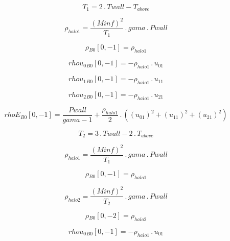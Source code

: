 \documentclass{article}
\begin{document}
\begin{dmath}T_{1} = 2 \,.\, Twall - T_{above}\end{dmath}

\begin{dmath}\rho_{halo 1} = \frac{\left(Minf \right)^{2}}{T_{1}} \,.\, gama \,.\, Pwall\end{dmath}

\begin{dmath}{\rho{_{B0}}}[{0,-1}] = \rho_{halo 1}\end{dmath}

\begin{dmath}{rhou_{0}{_{B0}}}[{0,-1}] = - \rho_{halo 1} \,.\, u_{01}\end{dmath}

\begin{dmath}{rhou_{1}{_{B0}}}[{0,-1}] = - \rho_{halo 1} \,.\, u_{11}\end{dmath}

\begin{dmath}{rhou_{2}{_{B0}}}[{0,-1}] = - \rho_{halo 1} \,.\, u_{21}\end{dmath}

\begin{dmath}{rhoE{_{B0}}}[{0,-1}] = \frac{Pwall}{gama - 1} + \frac{\rho_{halo 1}}{2} \,.\, \left(\left(u_{01} \right)^{2} + \left(u_{11} \right)^{2} + \left(u_{21} \right)^{2}\right)\end{dmath}

\begin{dmath}T_{2} = 3 \,.\, Twall - 2 \,.\, T_{above}\end{dmath}

\begin{dmath}\rho_{halo 1} = \frac{\left(Minf \right)^{2}}{T_{1}} \,.\, gama \,.\, Pwall\end{dmath}

\begin{dmath}{\rho{_{B0}}}[{0,-1}] = \rho_{halo 1}\end{dmath}

\begin{dmath}\rho_{halo 2} = \frac{\left(Minf \right)^{2}}{T_{2}} \,.\, gama \,.\, Pwall\end{dmath}

\begin{dmath}{\rho{_{B0}}}[{0,-2}] = \rho_{halo 2}\end{dmath}

\begin{dmath}{rhou_{0}{_{B0}}}[{0,-1}] = - \rho_{halo 1} \,.\, u_{01}\end{dmath}
\end{document}
